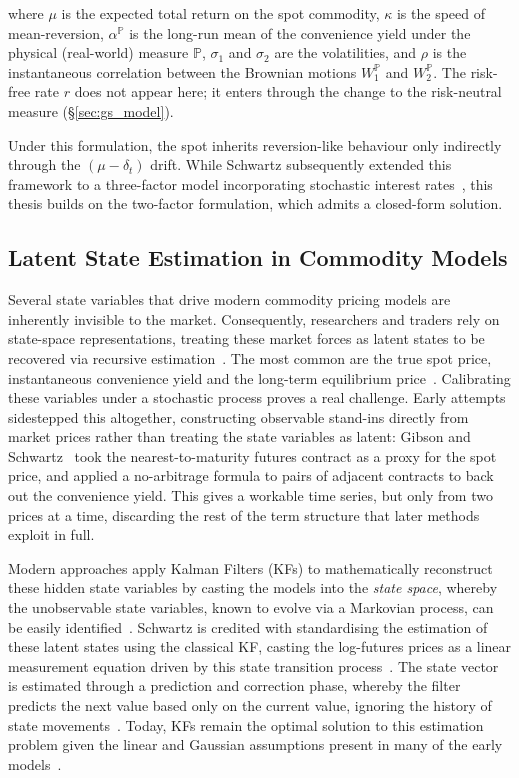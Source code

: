 \documentclass[sigconf, authorversion=true, nonacm=true]{acmart}
\begin{document}
where $\mu$ is the expected total return on the spot commodity, $\kappa$ is the speed of mean-reversion, $\alpha^{\mathbb{P}}$ is the long-run mean of the convenience yield under the physical (real-world) measure $\mathbb{P}$, $\sigma_1$ and $\sigma_2$ are the volatilities, and $\rho$ is the instantaneous correlation between the Brownian motions $W_1^{\mathbb{P}}$ and $W_2^{\mathbb{P}}$. The risk-free rate $r$ does not appear here; it enters through the change to the risk-neutral measure (\S\ref{sec:gs_model}).

Under this formulation, the spot inherits reversion-like behaviour only indirectly through the $(\mu-\delta_t)$ drift. While Schwartz subsequently extended this framework to a three-factor model incorporating stochastic interest rates~\cite{Schwartz1997TheHedging}, this thesis builds on the two-factor formulation, which admits a closed-form solution.

\subsection{Latent State Estimation in Commodity Models}
\label{sec:lit_estimation}

Several state variables that drive modern commodity pricing models are inherently invisible to the market. Consequently, researchers and traders rely on state-space representations, treating these market forces as latent states to be recovered via recursive estimation~\cite{Ribeiro2004A}. The most common are the true spot price, instantaneous convenience yield and the long-term equilibrium price~\cite{krul2008calibration}. Calibrating these variables under a stochastic process proves a real challenge. Early attempts sidestepped this altogether, constructing observable stand-ins directly from market prices rather than treating the state variables as latent: Gibson and Schwartz~\cite{Gibson1990StochasticClaims} took the nearest-to-maturity futures contract as a proxy for the spot price, and applied a no-arbitrage formula to pairs of adjacent contracts to back out the convenience yield. This gives a workable time series, but only from two prices at a time, discarding the rest of the term structure that later methods exploit in full.

Modern approaches apply Kalman Filters (KFs) to mathematically reconstruct these hidden state variables by casting the models into the \textit{state space}, whereby the unobservable state variables, known to evolve via a Markovian process, can be easily identified~\cite{Schwartz1997TheHedging, kalman1960new}. Schwartz is credited with standardising the estimation of these latent states using the classical KF, casting the log-futures prices as a linear measurement equation driven by this state transition process~\cite{Schwartz1997TheHedging, schwartz2000short}. The state vector is estimated through a prediction and correction phase, whereby the filter predicts the next value based only on the current value, ignoring the history of state movements~\cite{krul2008calibration}. Today, KFs remain the optimal solution to this estimation problem given the linear and Gaussian assumptions present in many of the early models~\cite{krul2008calibration}.
\end{document}
